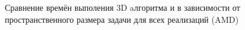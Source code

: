 \documentclass[10pt]{article}
\begin{document}
\begin{figure}[h]
\begin{minipage}[h]{0.99\textwidth}
\end{minipage}
\caption{Сравнение времён выполения 3D aлгоритма и в зависимости 
  от пространственного размера задачи для всех реализаций (AMD)}
\label{3D_amd}
\end{figure}
\clearpage
\end{document}

